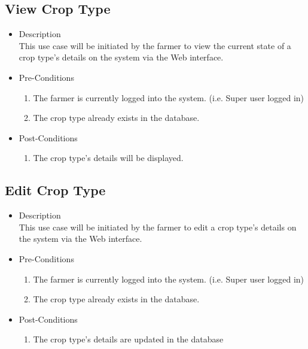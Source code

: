 \documentclass[11pt,fleqn]{book} %
\begin{document}
	\subsection{View Crop Type}
	\begin{itemize}
		\item Description\\
		This use case will be initiated by the farmer to view the current state of a crop type’s details on the system via the Web interface.
		\item Pre-Conditions
		\begin{enumerate}
			\item The farmer is currently logged into the system. (i.e. Super user logged in)
			\item The crop type already exists in the database.			
		\end{enumerate}
		\item Post-Conditions
		\begin{enumerate}
			\item The crop type’s details will be displayed.
		\end{enumerate}
	\end{itemize}
	
	\subsection{Edit Crop Type}
	\begin{itemize}
		\item Description\\
		This use case will be initiated by the farmer to edit a crop type’s details on the system via the Web interface.
		\item Pre-Conditions
		\begin{enumerate}
			\item The farmer is currently logged into the system. (i.e. Super user logged in)
			\item The crop type already exists in the database.					
		\end{enumerate}
		\item Post-Conditions
		\begin{enumerate}
			\item The crop type’s details are updated in the database
		\end{enumerate}
	\end{itemize}
	
\end{document}
